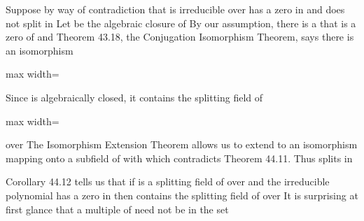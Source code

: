 \documentclass[11pt,oneside]{article}
\begin{document}
\begin{BookBody}

 Suppose by way of contradiction that  is irreducible over  has a zero \BookInline{\alpha } in  and  does not split in  Let  be the algebraic closure of  By our assumption, there is a  that is a zero of  and  Theorem 43.18, the Conjugation Isomorphism Theorem, says there is an isomorphism

\begin{center}\begin{adjustbox}{max width=\linewidth}\end{adjustbox}\end{center}

\noindent Since  is algebraically closed, it contains the splitting field of

\begin{center}\begin{adjustbox}{max width=\linewidth}\end{adjustbox}\end{center}

\noindent over  The Isomorphism Extension Theorem allows us to extend \BookInline{\psi _{\alpha,\allowbreak \beta }} to an isomorphism \BookInline{\sigma } mapping  onto a subfield of  with  which contradicts Theorem 44.11. Thus  splits in \BookEnd{\blacklozenge}

Corollary 44.12 tells us that if  is a splitting field of  over  and the irreducible polynomial  has a zero in  then  contains the splitting field of  over  It is surprising at first glance that a multiple of  need not be in the set 


\end{BookBody}
\end{document}
